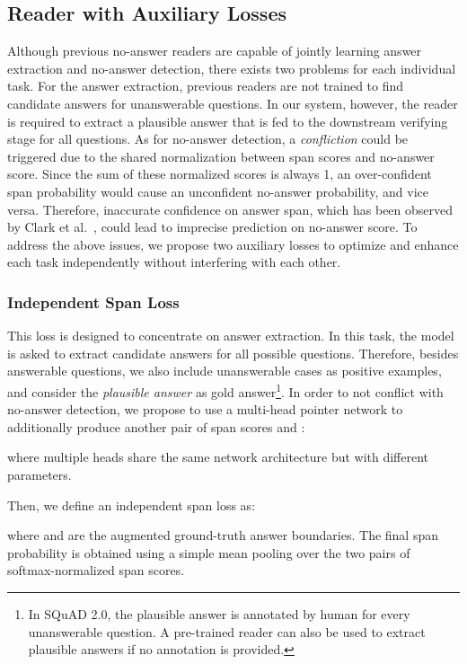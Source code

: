 \documentclass[letterpaper]{article} \usepackage{aaai19}  \usepackage{times}  \usepackage{helvet}  \usepackage{courier}  \usepackage{url}  \usepackage{graphicx}  \usepackage{pbox}
\begin{document}
\subsection{Reader with Auxiliary Losses}
Although previous no-answer readers are capable of jointly learning answer extraction and no-answer detection, there exists two problems for each individual task.
For the answer extraction, previous readers are not trained to find candidate answers for unanswerable questions.
In our system, however, the reader is required to extract a plausible answer that is fed to the downstream verifying stage for all questions.
As for no-answer detection, a \emph{confliction} could be triggered due to the shared normalization between span scores and no-answer score.
Since the sum of these normalized scores is always 1, an over-confident span probability would cause an unconfident no-answer probability, and vice versa.
Therefore, inaccurate confidence on answer span, which has been observed by Clark et al.~, could lead to imprecise prediction on no-answer score.
To address the above issues, we propose two auxiliary losses to optimize and enhance each task independently without interfering with each other.

\subsubsection{Independent Span Loss}
This loss is designed to concentrate on answer extraction.  
In this task, the model is asked to extract candidate answers for all possible questions. 
Therefore, besides answerable questions, we also include unanswerable cases as positive examples, and consider the \emph{plausible answer} as gold answer\footnote{In SQuAD 2.0, the plausible answer is annotated by human for every unanswerable question. A pre-trained reader can also be used to extract plausible answers if no annotation is provided.}.
In order to not conflict with no-answer detection, we propose to use a multi-head pointer network to additionally produce another pair of span scores  and :

where multiple heads share the same network architecture but with different parameters. 

Then, we define an independent span loss as:

where  and  are the augmented ground-truth answer boundaries. The final span probability is obtained using a simple mean pooling over the two pairs of softmax-normalized span scores.
\end{document}
